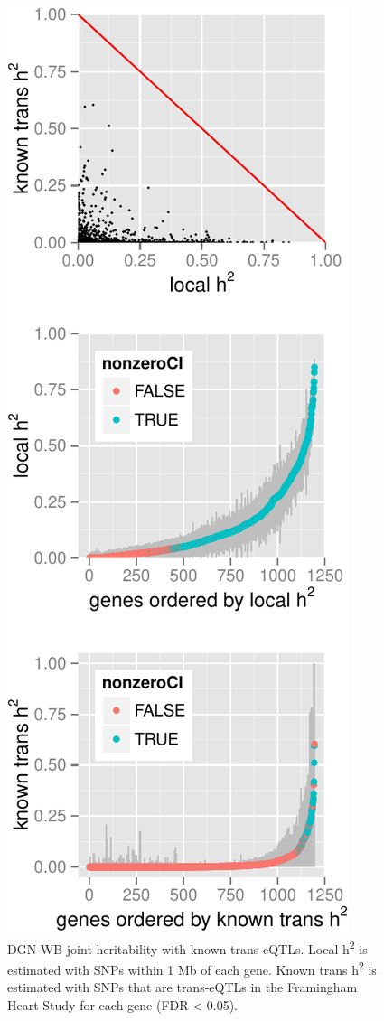 \documentclass[]{article}
\begin{document}
\begin{figure}[htbp]
\centering
\includegraphics{GenArch_manuscript_files/figure-latex/transH2-1.pdf}
\caption{DGN-WB joint heritability with known trans-eQTLs. Local
h\textsuperscript{2} is estimated with SNPs within 1 Mb of each gene.
Known trans h\textsuperscript{2} is estimated with SNPs that are
trans-eQTLs in the Framingham Heart Study for each gene (FDR \textless{}
0.05).}
\end{figure}
\end{document}
